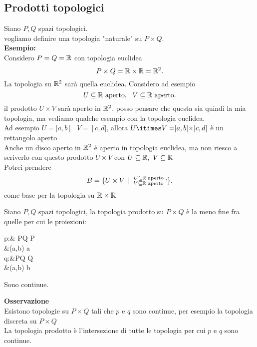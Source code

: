 \documentclass[12px]{article}
\begin{document}
	 \subsection{Prodotti topologici}
	 Siano $P,Q$ spazi topologici.\\
	 vogliamo definire una topologia "naturale" su $P\times Q$.\\
	  \textbf{Esempio:}\\
Considero $P = Q = \mathbb{R}$ con topologia euclidea
 \[
 P\times Q = \mathbb{R}\times \mathbb{R} = \mathbb{R}^2
.\] 
La topologia su $\mathbb{R}^2$ sarà quella euclidea. Considero ad esempio
\[
	U \subseteq \mathbb{R}\text{ aperto}, \ \ V\subseteq\mathbb{R}\text{ aperto}
.\] 
il prodotto $U\times V$ sarà aperto in  $\mathbb{R}^2$, posso pensare che questa sia quindi la mia topologia, ma vediamo qualche esempio con la topologia euclidea.\\
Ad esempio  $U = ]a,b[ \ \ \ V = ]c,d[$, allora  $U\itimes V = ]a,b[\times]c,d[$ è un rettangolo aperto\\
Anche un disco aperto in  $\mathbb{R}^2$ è aperto in topologia euclidea, ma non riesco a scriverlo con questo prodotto  $U\times V$ con $U\subseteq \mathbb{R}, \ V\subseteq \mathbb{R}$\\
Potrei prendere
 \[
	 B = \{U\times V \ | \ \ \substack{U\subseteq \R \text{ aperto },\\ \hspace{-3px}V\subseteq\R\text{ aperto }}\}
.\] 
come base per la topologia su $\mathbb{R}\times\mathbb{R}$
 \begin{defi}
	Siano $P,Q$ spazi topologici, la topologia prodotto su $P\times Q$ è la meno fine fra quelle per cui le proiezioni:
	\begin{center}
		\begin{aligned}
			p:& P\times Q \rightarrow P\\
			  &(a,b) \rightarrow a\\
			q:&P\times Q \rightarrow Q\\
			  &(a,b) \rightarrow b
		\end{aligned}
	\end{center}
	Sono continue.
\end{defi}
\textbf{Osservazione}\\
Esistono topologie su $P\times Q$ tali che  $p$ e $q$ sono continue, per esempio la topologia discreta su $P\times Q$\\
La topologia prodotto è l'intersezione di tutte le topologia per cui  $p$ e $q$ sono continue.
\begin{teo}
	
\end{teo}
\end{document}
